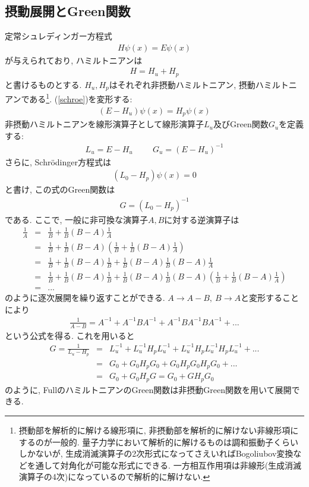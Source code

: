 \documentclass[10.5pt,a4paper]{jreport}
\begin{document}
\subsection{摂動展開とGreen関数}
定常シュレディンガー方程式
\begin{eqnarray}
  H\psi(x) = E\psi(x)\label{schroe}
\end{eqnarray}
が与えられており, ハミルトニアンは
\begin{eqnarray}
  H = H_u + H_p
\end{eqnarray}
と書けるものとする. $H_u, H_p$はそれぞれ非摂動ハミルトニアン, 摂動ハミルトニアンである\footnote{摂動部を解析的に解ける線形項に, 非摂動部を解析的に解けない非線形項にするのが一般的. 量子力学において解析的に解けるものは調和振動子くらいしかないが, 生成消滅演算子の2次形式になってさえいればBogoliubov変換などを通して対角化が可能な形式にできる. 一方相互作用項は非線形(生成消滅演算子の4次)になっているので解析的に解けない.}. (\ref{schroe})を変形する:
\begin{eqnarray}
  (E-H_u)\psi(x) = H_p\psi(x)
\end{eqnarray}
非摂動ハミルトニアンを線形演算子として線形演算子$L_u$及びGreen関数$G_u$を定義する:
\begin{eqnarray}
  L_u = E-H_u\hspace{1cm}G_u = (E-H_u)^{-1}
\end{eqnarray}
さらに, Schr\"odinger方程式は
\begin{eqnarray}
  (L_0-H_p)\psi(x) = 0
\end{eqnarray}
と書け, この式のGreen関数は
\begin{eqnarray}
  G = (L_0 - H_p)^{-1}
\end{eqnarray}
である. ここで, 一般に非可換な演算子$A, B$に対する逆演算子は
\begin{eqnarray}
  \frac{1}{A} &=& \frac{1}{B} + \frac{1}{B}(B-A)\frac{1}{A}\\
  &=& \frac{1}{B} + \frac{1}{B}(B-A)\left(\frac{1}{B} + \frac{1}{B}(B-A)\frac{1}{A}\right)\\
  &=& \frac{1}{B} + \frac{1}{B}(B-A)\frac{1}{B} + \frac{1}{B}(B-A)\frac{1}{B}(B-A)\frac{1}{A}\\
  &=& \frac{1}{B} + \frac{1}{B}(B-A)\frac{1}{B} + \frac{1}{B}(B-A)\frac{1}{B}(B-A)\left(\frac{1}{B} + \frac{1}{B}(B-A)\frac{1}{A}\right)\\
  \nonumber    &=& ...
\end{eqnarray}
のように逐次展開を繰り返すことができる. $A \rightarrow A - B,\ B \rightarrow A$と変形することにより
\begin{eqnarray}
  \frac{1}{A-B} = A^{-1} + A^{-1}BA^{-1} + A^{-1}BA^{-1}BA^{-1} + ...
\end{eqnarray}
という公式を得る. これを用いると
\begin{eqnarray}
  G = \frac{1}{L_u - H_p} &=& L_u^{-1} + L_u^{-1}H_pL_u^{-1} + L_u^{-1}H_pL_u^{-1}H_pL_u^{-1} + ...\\
  &=& G_0 + G_0H_pG_0 + G_0H_pG_0H_pG_0 + ...\\
  &=& G_0 + G_0H_pG = G_0 + GH_pG_0
\end{eqnarray}
のように, FullのハミルトニアンのGreen関数は非摂動Green関数を用いて展開できる.
\end{document}
